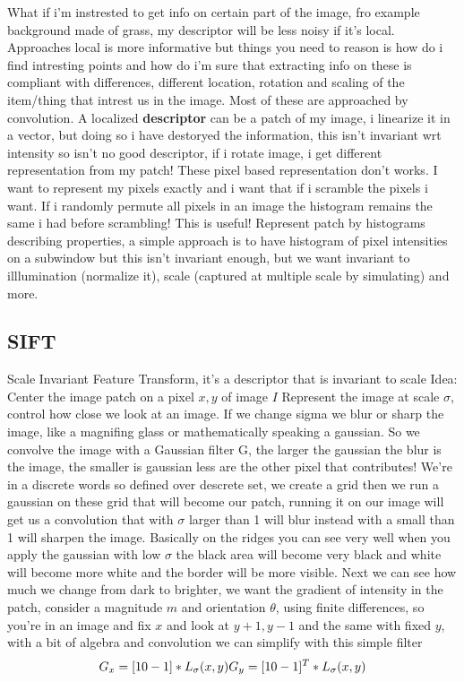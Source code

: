 \documentclass[12pt]{book}
\begin{document}
What if i'm instrested to get info on certain part of the image, fro example background made of grass, my descriptor will be less noisy if it's local. Approaches local is more informative but things you need to reason is how do i find intresting points and how do i'm sure that extracting info on these is compliant with differences, different location, rotation and scaling of the item/thing that intrest us in the image.\newline
Most of these are approached by convolution. A localized \textbf{descriptor} can be a patch of my image, i linearize it in a vector, but doing so i have destoryed the information, this isn't invariant wrt intensity so isn't no good descriptor, if i rotate image, i get different representation from my patch! These pixel based representation don't works. I want to represent my pixels exactly and i want that if i scramble the pixels i want. If i randomly permute all pixels in an image the histogram remains the same i had before scrambling! This is useful!\newline
Represent patch by histograms describing properties, a simple approach is to have histogram of pixel intensities on a subwindow but this isn't invariant enough, but we want invariant to illlumination (normalize it), scale (captured at multiple scale by simulating) and more.\newline

\subsection{SIFT}
Scale Invariant Feature Transform, it's a descriptor that is invariant to scale
Idea: Center the image patch on a pixel $x,y$ of image $I$
Represent the image at scale $\sigma$, control how close we look at an image. If we change sigma we blur or sharp the image, like a magnifing glass or mathematically speaking a gaussian.
So we convolve the image with a Gaussian filter G, the larger the gaussian the blur is the image, the smaller is gaussian less are the other pixel that contributes!\newline
We're in a discrete words so defined over descrete set, we create a grid then we run a gaussian on these grid that will become our patch, running it on our image will get us a convolution that with $\sigma$ larger than 1 will blur instead with a small than 1 will sharpen the image. Basically on the ridges you can see very well when you apply the gaussian with low $\sigma$ the black area will become very black and white will become more white and the border will be more visible.
Next we can see how much we change from dark to brighter, we want the gradient of intensity in the patch, consider a magnitude $m$ and orientation $\theta$, using finite differences, so you're in an image and fix $x$ and look at $y+1, y-1$ and the same with fixed $y$, with a bit of algebra and convolution we can simplify with this simple filter
\begin{equation}
	G_x = [1 0 -1]*L_\sigma(x,y)\\
	G_y = [1 0 -1]^T*L_\sigma(x,y)
\end{equation}
\end{document}
